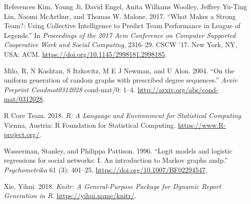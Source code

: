 \documentclass[10pt,ignorenonframetext,aspectratio=169,]{beamer}
\begin{document}
\begin{frame}[allowframebreaks]{References}
\leavevmode\hypertarget{ref-Kim2017}{}%
Kim, Young Ji, David Engel, Anita Williams Woolley, Jeffrey Yu-Ting Lin,
Naomi McArthur, and Thomas W. Malone. 2017. ``What Makes a Strong Team?:
Using Collective Intelligence to Predict Team Performance in League of
Legends.'' In \emph{Proceedings of the 2017 Acm Conference on Computer
Supported Cooperative Work and Social Computing}, 2316--29. CSCW '17.
New York, NY, USA: ACM. \url{https://doi.org/10.1145/2998181.2998185}.

\leavevmode\hypertarget{ref-Milo2004}{}%
Milo, R, N Kashtan, S Itzkovitz, M E J Newman, and U Alon. 2004. ``On
the uniform generation of random graphs with prescribed degree
sequences.'' \emph{Arxiv Preprint Condmat0312028} cond-mat/0: 1--4.
\url{http://arxiv.org/abs/cond-mat/0312028}.

\leavevmode\hypertarget{ref-R}{}%
R Core Team. 2018. \emph{R: A Language and Environment for Statistical
Computing}. Vienna, Austria: R Foundation for Statistical Computing.
\url{https://www.R-project.org/}.

\leavevmode\hypertarget{ref-Wasserman1996}{}%
Wasserman, Stanley, and Philippa Pattison. 1996. ``Logit models and
logistic regressions for social networks: I. An introduction to Markov
graphs andp.'' \emph{Psychometrika} 61 (3): 401--25.
\url{https://doi.org/10.1007/BF02294547}.

\leavevmode\hypertarget{ref-knitr}{}%
Xie, Yihui. 2018. \emph{Knitr: A General-Purpose Package for Dynamic
Report Generation in R}. \url{https://yihui.name/knitr/}.

\end{frame}
\end{document}
